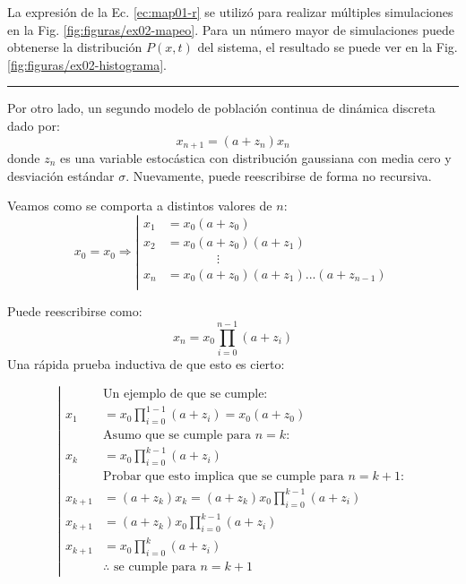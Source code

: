 \documentclass[twocolumn,aps,prl]{revtex4-1}
\newcommand*\sepline{%
  \begin{center}
    \rule[1ex]{.5\textwidth}{.1pt}
  \end{center}}
\begin{document}
La expresión de la Ec. \ref{ec:map01-r} se utilizó para realizar múltiples simulaciones en la Fig. \ref{fig:figuras/ex02-mapeo}. Para un número mayor de simulaciones puede obtenerse la distribución $P(x,t)$ del sistema, el resultado se puede ver en la Fig. \ref{fig:figuras/ex02-histograma}.
\sepline
Por otro lado, un segundo modelo de población continua de dinámica discreta dado por:
\begin{equation}\label{ec:map02}
  x_{n+1} = (a + z_n) x_n
\end{equation}
donde $z_n$ es una variable estocástica con distribución gaussiana con media cero y desviación estándar $\sigma$. Nuevamente, puede reescribirse de forma no recursiva.

Veamos como se comporta a distintos valores de $n$:
\begin{equation}
  x_0 = x_0 \Rightarrow
  \left\vert\begin{aligned}
    x_1 &= x_0 (a + z_0) \\
    x_2 &= x_0 (a + z_0) (a + z_1)\\
        & \qquad \qquad \vdots \\
    x_n &= x_0 (a + z_0) (a + z_1) ... (a + z_{n-1})\\
  \end{aligned}\right.
\end{equation}

Puede reescribirse como:
\begin{equation}\label{ec:map02-r}
  x_n = x_0 \prod_{i=0}^{n-1} (a + z_i)
\end{equation}
Una rápida prueba inductiva de que esto es cierto:

\begin{equation}
  \left|
  \begin{aligned}
    & \text{Un ejemplo de que se cumple:} \\
    x_1 &= x_0 \prod_{i=0}^{1-1} (a + z_i) = x_0 (a + z_0)\\
    & \text{Asumo que se cumple para $n=k$:} \\
    x_k &= x_0 \prod_{i=0}^{k-1} (a + z_i)\\
    & \text{Probar que esto implica que se cumple para $n=k+1$:} \\
    x_{k+1} &= (a + z_k) x_k = (a + z_k) x_0 \prod_{i=0}^{k-1} (a + z_i) \\
    x_{k+1} &= (a + z_k) x_0 \prod_{i=0}^{k-1} (a + z_i) \\
    x_{k+1} &= x_0 \prod_{i=0}^{k} (a + z_i) \\
    & \text{$\therefore$ se cumple para $n=k+1$}
  \end{aligned}
  \right.  
\end{equation}
\end{document}
